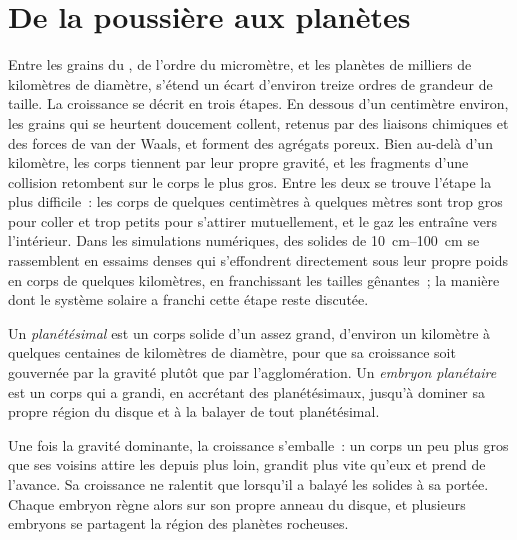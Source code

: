 \section{De la poussière aux planètes}

Entre les grains du , de l'ordre du micromètre, et les planètes de
milliers de kilomètres de diamètre, s'étend un écart d'environ treize ordres de grandeur de
taille. La croissance se décrit en trois étapes. En dessous d'un centimètre environ, les grains
qui se heurtent doucement collent, retenus par des liaisons chimiques et des forces de van der
Waals, et forment des agrégats poreux. Bien au-delà d'un kilomètre, les corps tiennent par leur
propre gravité, et les fragments d'une collision retombent sur le corps le plus gros. Entre les
deux se trouve l'étape la plus difficile~: les corps de quelques centimètres à quelques mètres
sont trop gros pour coller et trop petits pour s'attirer mutuellement, et le gaz les entraîne
vers l'intérieur. Dans les simulations numériques, des solides de \qtyrange{10}{100}{cm} se
rassemblent en essaims denses qui s'effondrent directement sous leur propre poids en corps de
quelques kilomètres, en franchissant les tailles gênantes~; la manière dont le système solaire
a franchi cette étape reste discutée.

\begin{definition}
\label{def:b2:planet-formation-meteorites:planetesimal}
Un \emph{planétésimal} est un corps solide d'un  assez grand, d'environ un kilomètre à quelques centaines de kilomètres de
diamètre, pour que sa croissance soit gouvernée par la gravité plutôt que par
l'agglomération. Un \emph{embryon planétaire} est un corps qui
a grandi, en accrétant des planétésimaux, jusqu'à dominer sa propre région du disque et à
la balayer de tout planétésimal.
\end{definition}

Une fois la gravité dominante, la croissance s'emballe~: un corps un peu plus gros que ses
voisins attire les  depuis plus loin, grandit plus vite qu'eux et prend de
l'avance. Sa croissance ne ralentit que lorsqu'il a balayé les solides à sa portée. Chaque
embryon règne alors sur son propre anneau du disque, et plusieurs embryons se partagent la
région des planètes rocheuses.

